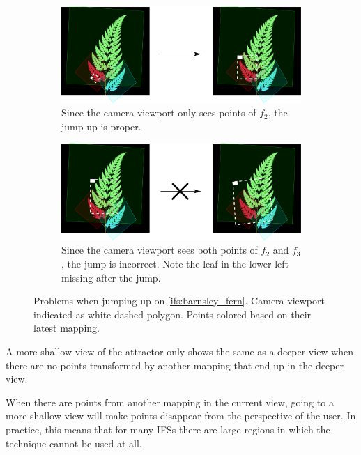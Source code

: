 \documentclass[11pt]{article}
\begin{document}
\begin{enumerate}
\begin{figure}
     \centering
     \begin{subfigure}[b]{\textwidth}
         \centering
         \includegraphics[width=\textwidth]{figures/barnsley_colored_jump1}
         \caption{Since the camera viewport only sees points of $f_2$, the jump up is proper.}
         \label{figure:barnsley_jump_a}
     \end{subfigure}
     \hfill
     \begin{subfigure}[b]{\textwidth}
         \centering
         \includegraphics[width=\textwidth]{figures/barnsley_colored_jump2}
         \caption{Since the camera viewport sees both points of $f_2$ and $f_3$, the jump is incorrect. Note the leaf in the lower left missing after the jump.}
         \label{figure:barnsley_jump_b}
     \end{subfigure}
        \caption{Problems when jumping up on \autoref{ifs:barnsley_fern}. Camera viewport indicated as white dashed polygon.
Points colored based on their latest mapping. }
        \label{figure:barnsley_jump}
\end{figure}



A more shallow view of the attractor only shows the same as a deeper view when
there are no points transformed by another mapping that end up in the deeper view.

When there are points from another mapping in the current view, 
going to a more shallow view will make points disappear from the perspective of the user.
In practice, this means that for many IFSs there are large regions in which the technique cannot be used at all.


\end{enumerate}
\end{document}
